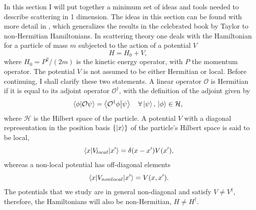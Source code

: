 In this section I will put together a minimum set of ideas and tools needed to describe scattering in 1 dimension. The ideas in this section can be found with more detail in \cite{Muga2004}, which generalizes the results in the celebrated book by Taylor \cite{Taylor1972} to non-Hermitian Hamiltonians. In scattering theory one deals with the Hamiltonian for a particle of mass $m$ subjected to the action of a potential $V$
%
\begin{equation}
  H =  H_0 + V,
\end{equation}
%
where $H_0=P^2/(2m)$ is the kinetic energy operator, with $P$ the momentum operator. The potential $V$ is not assumed to be either Hermitian or local. Before continuing, I shall clarify these two statements. A linear operator $\mathcal{O}$ is Hermitian if it is equal to its adjoint operator $\mathcal{O}^\dagger$, with the definition of the adjoint given by
%
\begin{equation}
  \braket{\phi}{\mathcal{O}\psi} = \braket{\mathcal{O}^\dagger\phi}{\psi}\quad\forall\ket{\psi},\,\ket{\phi}\in\mathcal{H},
  \label{eq:chapter1_adjointLinearOperators}
\end{equation}
%
where $\mathcal{H}$ is the Hilbert space of the particle. A potential $V$ with a diagonal representation in the position basis $\{\ket{x}\}$ of the particle's Hilbert space is said to be local,
%
\begin{equation}
  \mel{x}{V_{local}}{x'} = \delta(x-x')V(x'),
  \label{eq:chapter1_localPotential}
\end{equation}
%
whereas a non-local potential has off-diagonal elements
%
\begin{equation}
  \mel{x}{V_{non local}}{x'} = V(x,x').
  \label{eq:chapter1_nonLocalPotential}
\end{equation}
%
The potentials that we study are in general non-diagonal and satisfy $V \neq V^\dagger$, therefore, the Hamiltonians will also be non-Hermitian, $H \neq H^\dagger$.

